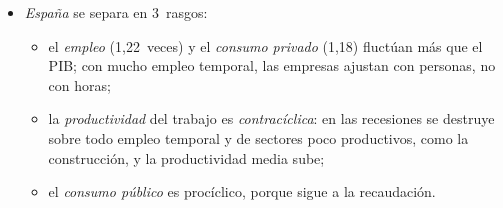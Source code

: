 \documentclass[11pt]{article}
\begin{document}
\begin{itemize}
\begin{itemize}
  \item los precios y los tipos de interés a corto plazo van detrás del ciclo; la bolsa y la pendiente de la curva de tipos, delante.
  \end{itemize}
\item \emph{España} se separa en 3~rasgos\nocite{AlvarezGadeaGomezLoscos2021}:
  \begin{itemize}
  \item el \emph{empleo} (1,22~veces) y el \emph{consumo privado} (1,18) fluctúan más que el PIB; con mucho empleo temporal, las empresas ajustan con personas, no con horas;
  \item la \emph{productividad} del trabajo es \emph{contracíclica}: en las recesiones se destruye sobre todo empleo temporal y de sectores poco productivos, como la construcción, y la productividad media sube\nocite{BBVA2020Improductividad};
  \item el \emph{consumo público} es procíclico, porque sigue a la recaudación.
  \end{itemize}
\end{itemize}
\end{document}
